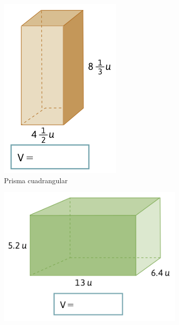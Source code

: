\begin{figure}[H]
\begin{subfigure}{.25\textwidth}
        \includegraphics[width=\linewidth]{../images/20230319051030}
        \caption{Prisma cuadrangular}
        \label{sfig:20230319051030}
    \end{subfigure}
    \begin{subfigure}{.25\textwidth}
        \includegraphics[width=\linewidth]{../images/20230319051039}

\end{subfigure}
\end{figure}
